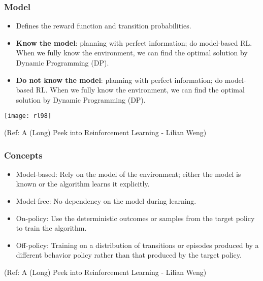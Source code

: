 \begin{frame}[fragile]\frametitle{Model}


\begin{itemize}
\item Defines the reward function and transition probabilities.
\item {\bf Know the model}: planning with perfect information; do model-based RL. When we fully know the
environment, we can find the optimal solution by Dynamic Programming (DP).
\item {\bf Do not know the model}: planning with perfect information; do model-based RL. When we fully know the
environment, we can find the optimal solution by Dynamic Programming (DP).
\end{itemize}


\begin{center}
\texttt{[image: rl98]}
\end{center}


{\tiny (Ref: A (Long) Peek into Reinforcement Learning - Lilian Weng)}


\end{frame}

\begin{frame}[fragile]\frametitle{Concepts}


\begin{itemize}
\item Model-based: Rely on the model of the environment; either the model is known or the algorithm learns it explicitly.
\item Model-free: No dependency on the model during learning.
\item On-policy: Use the deterministic outcomes or samples from the target policy to train the algorithm.
\item Off-policy: Training on a distribution of transitions or episodes produced by a different behavior
policy rather than that produced by the target policy.
\end{itemize}

{\tiny (Ref: A (Long) Peek into Reinforcement Learning - Lilian Weng)}


\end{frame}

